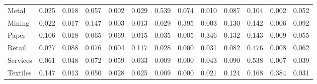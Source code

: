 \begin{table}[htbp]
\begin{tabular}{lcccccccccccc}
  Metal & \textcolor[RGB]{156,101,99}{0.025} & \textcolor[RGB]{170,110,85}{0.018} & \textcolor[RGB]{103,66,152}{0.057} & \textcolor[RGB]{239,155,16}{0.002} & \textcolor[RGB]{142,92,113}{0.029} & \textcolor[RGB]{2,1,253}{0.539} & \textcolor[RGB]{81,53,174}{0.074} & \textcolor[RGB]{191,124,64}{0.010} & \textcolor[RGB]{67,44,188}{0.087} & \textcolor[RGB]{58,38,197}{0.104} & \textcolor[RGB]{237,154,18}{0.002} & \textcolor[RGB]{108,70,147}{0.052} \\ 
  Mining & \textcolor[RGB]{165,107,90}{0.022} & \textcolor[RGB]{172,111,83}{0.017} & \textcolor[RGB]{28,18,227}{0.147} & \textcolor[RGB]{230,149,25}{0.003} & \textcolor[RGB]{184,119,71}{0.013} & \textcolor[RGB]{143,93,112}{0.029} & \textcolor[RGB]{12,8,243}{0.395} & \textcolor[RGB]{236,152,19}{0.003} & \textcolor[RGB]{44,29,211}{0.130} & \textcolor[RGB]{39,25,216}{0.142} & \textcolor[RGB]{214,139,41}{0.006} & \textcolor[RGB]{62,40,193}{0.092} \\ 
  Paper & \textcolor[RGB]{57,37,198}{0.106} & \textcolor[RGB]{168,109,87}{0.018} & \textcolor[RGB]{94,61,161}{0.065} & \textcolor[RGB]{92,60,163}{0.069} & \textcolor[RGB]{177,115,78}{0.015} & \textcolor[RGB]{128,82,128}{0.035} & \textcolor[RGB]{216,140,39}{0.005} & \textcolor[RGB]{16,10,239}{0.346} & \textcolor[RGB]{42,27,212}{0.132} & \textcolor[RGB]{37,24,218}{0.143} & \textcolor[RGB]{193,125,62}{0.009} & \textcolor[RGB]{104,68,151}{0.055} \\ 
  Retail & \textcolor[RGB]{151,97,104}{0.027} & \textcolor[RGB]{66,42,189}{0.088} & \textcolor[RGB]{80,52,175}{0.076} & \textcolor[RGB]{225,146,30}{0.004} & \textcolor[RGB]{53,34,202}{0.117} & \textcolor[RGB]{145,94,110}{0.028} & \textcolor[RGB]{250,162,5}{0.000} & \textcolor[RGB]{140,91,115}{0.031} & \textcolor[RGB]{74,48,181}{0.082} & \textcolor[RGB]{9,6,246}{0.476} & \textcolor[RGB]{204,132,51}{0.008} & \textcolor[RGB]{96,62,159}{0.062} \\ 
  Services & \textcolor[RGB]{97,63,158}{0.061} & \textcolor[RGB]{112,72,143}{0.048} & \textcolor[RGB]{85,55,170}{0.072} & \textcolor[RGB]{101,65,154}{0.059} & \textcolor[RGB]{133,86,122}{0.033} & \textcolor[RGB]{200,129,55}{0.009} & \textcolor[RGB]{246,159,9}{0.000} & \textcolor[RGB]{119,77,136}{0.043} & \textcolor[RGB]{64,41,191}{0.090} & \textcolor[RGB]{4,2,251}{0.538} & \textcolor[RGB]{209,135,46}{0.007} & \textcolor[RGB]{124,80,131}{0.039} \\ 
  Textiles & \textcolor[RGB]{30,19,225}{0.147} & \textcolor[RGB]{186,120,69}{0.013} & \textcolor[RGB]{110,71,145}{0.050} & \textcolor[RGB]{147,95,108}{0.028} & \textcolor[RGB]{159,103,96}{0.025} & \textcolor[RGB]{202,131,53}{0.009} & \textcolor[RGB]{248,160,7}{0.000} & \textcolor[RGB]{166,108,89}{0.021} & \textcolor[RGB]{50,32,205}{0.124} & \textcolor[RGB]{25,16,230}{0.168} & \textcolor[RGB]{14,9,241}{0.384} & \textcolor[RGB]{135,87,120}{0.031} \\ 

\end{tabular}
\end{table}
